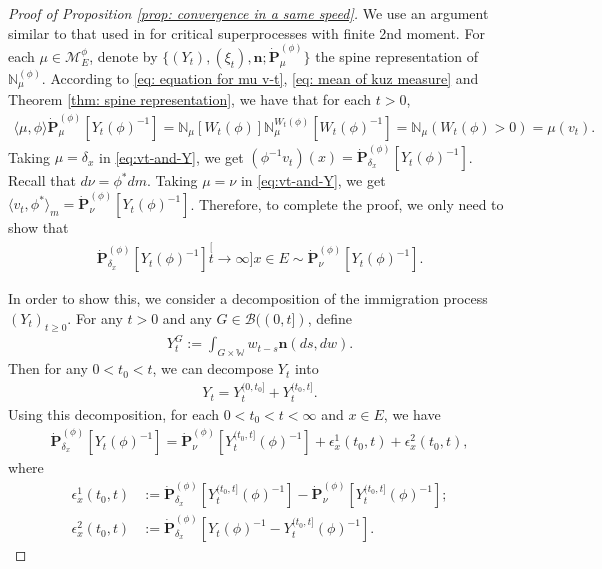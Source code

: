 \documentclass[12pt,a4paper]{amsart}
\theoremstyle{definition}
\numberwithin{equation}{section}
\begin{document}
\begin{proof}
  [Proof of Proposition \ref{prop: convergence in a same speed}]
	We use an argument similar to that used in \cite{RenSongSun2017Spine} for critical superprocesses with finite 2nd moment.
	For each $\mu\in\mathcal M^\phi_E$, denote by $\{(Y_t), (\xi_t),\mathbf n; \dot {\mathbf P}^{(\phi)}_\mu\}$ the spine representation of $\mathbb N^{(\phi)}_\mu$.
	According to \eqref	{eq: equation for mu v-t}, \eqref{eq: mean of kuz measure} and Theorem \ref{thm: spine representation}, we have that for each $t>0$,
\begin{align}
\label{eq:vt-and-Y}
	\langle \mu,\phi \rangle \dot {\mathbf P}^{(\phi)}_\mu [Y_t(\phi)^{-1}]
	= \mathbb N_\mu[W_t(\phi)] \mathbb N^{W_t(\phi)}_\mu [W_t(\phi)^{-1}]
	= \mathbb N_\mu(W_t(\phi) > 0)
	= \mu(v_t).
\end{align}
Taking $\mu = \delta_x$ in \eqref{eq:vt-and-Y}, we get $(\phi^{-1}v_t)(x) =\dot{\mathbf P}_{\delta_x}^{(\phi)}[Y_t(\phi)^{-1}]$.
Recall that $d\nu = \phi^* dm$. 
Taking $\mu = \nu$ in \eqref{eq:vt-and-Y}, we get $\langle v_t, \phi^*\rangle_m = \dot {\mathbf P}_{\nu}^{(\phi)} [Y_t(\phi)^{-1}]$.
Therefore, to complete the proof, we only need to show that
\begin{align}
  \label{eq:desired_for_main_theorem_2}
	\dot{\mathbf P}_{\delta_x}^{(\phi)}[Y_t(\phi)^{-1}]
	\stackrel[t\to \infty]{x\in E}{\sim}  \dot {\mathbf P}_\nu^{(\phi)} [Y_t(\phi)^{-1}].
\end{align}

In order to show this, we consider a decomposition of the immigration process $(Y_t)_{t\geq 0}$.
For any $t>0$ and any $G\in \mathscr B((0,t])$, define
\begin{align}
	Y^G_t
	:= \int_{G\times \mathbb W} w_{t-s} \mathbf n(ds,dw).
\end{align}
Then for any $0 < t_0 < t$, we can decompose $Y_t$ into
\begin{align}
	Y_t
	= Y^{(0,t_0]}_t + Y^{(t_0,t]}_t.
\end{align}
Using this decomposition, for each $0<t_0<t<\infty$ and $x\in E$, we have
\begin{align}
  \label{eq: starting point of phi-1v_t(x)}
  \dot{\mathbf P}_{\delta_x}^{(\phi)}[Y_t(\phi)^{-1}]
	= \dot {\mathbf P}_\nu^{(\phi)} [Y^{(t_0,t]}_t(\phi)^{-1}] + \epsilon_x^1(t_0,t) +\epsilon_x^2(t_0,t),
\end{align}
where
\begin{align}
	\epsilon_x^1(t_0,t)
	&:= \dot {\mathbf P}_{\delta_x}^{(\phi)} [Y^{(t_0,t]}_t(\phi)^{-1}] - \dot {\mathbf P}_\nu^{(\phi)} [Y^{(t_0,t]}_t(\phi)^{-1}];
	\\\epsilon_x^2(t_0,t)
	&:= \dot{\mathbf P}_{\delta_x}^{(\phi)}[Y_t(\phi)^{-1} - Y^{(t_0,t]}_t(\phi)^{-1}].
\end{align}


\end{proof}
\end{document}
